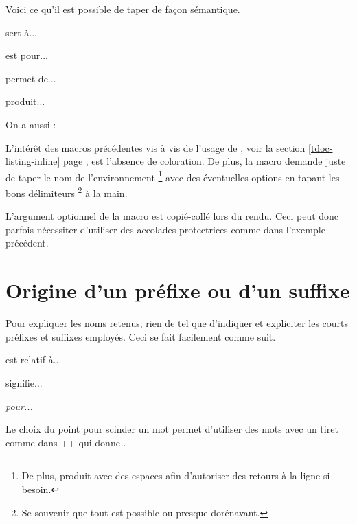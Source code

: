 Voici ce qu'il est possible de taper de façon sémantique.


\begin{tdoclatex}[sbs]
 sert à...

 est pour...

 permet de...

 produit...

On a aussi :

\end{tdoclatex}


\begin{tdocrem}
    L'intérêt des macros précédentes vis à vis de l'usage de , voir la section \ref{tdoc-listing-inline} page \pageref{tdoc-listing-inline}, est l'absence de coloration.
    De plus, la macro  demande juste de taper le nom de l'environnement
    \footnote{
        De plus,  produit  avec des espaces afin d'autoriser des retours à la ligne si besoin.
    }
    avec des éventuelles options en tapant les bons délimiteurs
    \footnote{
        Se souvenir que tout est possible ou presque dorénavant.
    }
    à la main.
\end{tdocrem}


\begin{tdocwarn}
    L'argument optionnel de la macro  est copié-collé lors du rendu. Ceci peut donc parfois nécessiter d'utiliser des accolades protectrices comme dans l'exemple précédent.
\end{tdocwarn}




\section{Origine d'un préfixe ou d'un suffixe}

Pour expliquer les noms retenus, rien de tel que d'indiquer et expliciter les courts préfixes et suffixes employés. Ceci se fait facilement comme suit.


\begin{tdoclatex}[sbs]
 est relatif à...

 signifie...

\emph{ pour...}
\end{tdoclatex}


\begin{tdocrem}
    Le choix du point pour scinder un mot permet d'utiliser des mots avec un tiret comme dans \tdocinlatex++ qui donne .
\end{tdocrem}


